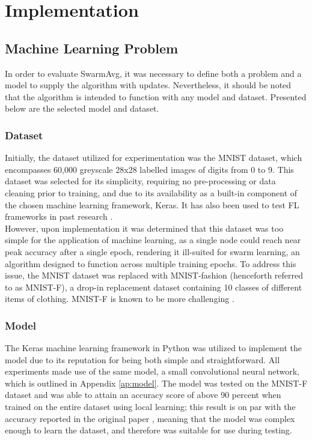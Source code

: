 \chapter{Implementation}
\section{Machine Learning Problem}
In order to evaluate SwarmAvg, it was necessary to define both a problem and a model to supply the algorithm with updates. Nevertheless, it should be noted that the algorithm is intended to function with any model and dataset. Presented below are the selected model and dataset.

\subsection{Dataset}
Initially, the dataset utilized for experimentation was the MNIST dataset, which encompasses 60,000 greyscale 28x28 labelled images of digits from 0 to 9. This dataset was selected for its simplicity, requiring no pre-processing or data cleaning prior to training, and due to its availability as a built-in component of the chosen machine learning framework, Keras. It has also been used to test FL frameworks in past research \cite{leaderelec_car}. \\

However, upon implementation it was determined that this dataset was too simple for the application of machine learning, as a single node could reach near peak accuracy after a single epoch, rendering it ill-suited for swarm learning, an algorithm designed to function across multiple training epochs.  To address this issue, the MNIST dataset was replaced with MNIST-fashion (henceforth referred to as MNIST-F), a drop-in replacement dataset containing 10 classes of different items of clothing. MNIST-F is known to be more challenging \cite{xiao2017fashionmnist}.

\subsection{Model}
The Keras machine learning framework in Python was utilized to implement the model due to its reputation for being both simple and straightforward. All experiments made use of the same model, a small convolutional neural network, which is outlined in Appendix \ref{ap:model}. The model was tested on the MNIST-F dataset and was able to attain an accuracy score of above 90 percent when trained on the entire dataset using local learning; this result is on par with the accuracy reported in the original paper \cite{xiao2017fashionmnist}, meaning that the model was complex enough to learn the dataset, and therefore was suitable for use during testing.


